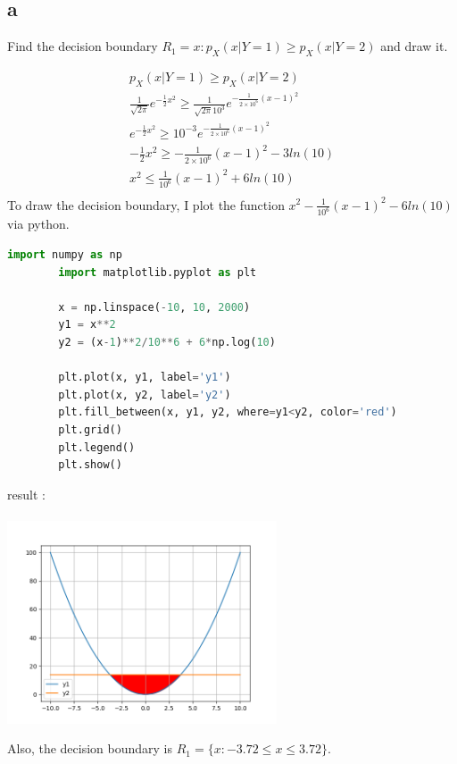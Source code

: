 \documentclass[12pt]{article}
\begin{document}
\subsection{a}
Find the decision boundary $R_1 = x : p_X (x|Y=1) \geq p_X(x|Y=2)$ and draw it.
\begin{qsolve}
    \begin{gather*}
        p_X (x|Y=1) \geq p_X(x|Y=2) \\
        \frac{1}{\sqrt{2\pi}} e^{-\frac{1}{2}x^2} \geq \frac{1}{\sqrt{2\pi}10^3} e^{-\frac{1}{2\times 10^6}(x-1)^2} \\
        e^{-\frac{1}{2}x^2} \geq 10^{-3} e^{-\frac{1}{2\times 10^6}(x-1)^2} \\
        -\frac{1}{2}x^2 \geq -\frac{1}{2\times 10^6}(x-1)^2 - 3ln(10) \\
        x^2 \leq \frac{1}{10^6} (x-1)^2 + 6ln(10) \\
    \end{gather*}
    To draw the decision boundary, I plot the function $x^2 - \frac{1}{10^6} (x-1)^2 - 6ln(10)$ via python.
    \begin{lstlisting}[language=Python]
        import numpy as np
        import matplotlib.pyplot as plt
        
        x = np.linspace(-10, 10, 2000)
        y1 = x**2
        y2 = (x-1)**2/10**6 + 6*np.log(10)
        
        plt.plot(x, y1, label='y1')
        plt.plot(x, y2, label='y2')
        plt.fill_between(x, y1, y2, where=y1<y2, color='red')
        plt.grid()
        plt.legend()
        plt.show()        
    \end{lstlisting}
    \splitqsolve
    result : \\ \\
    \centering
    \includegraphics[width=0.6\textwidth]{plot1.png}
    \begin{flushleft}
        Also, the decision boundary is $R_1 = \{x : -3.72 \leq x \leq 3.72\}$.
    \end{flushleft}
\end{qsolve}
\end{document}
